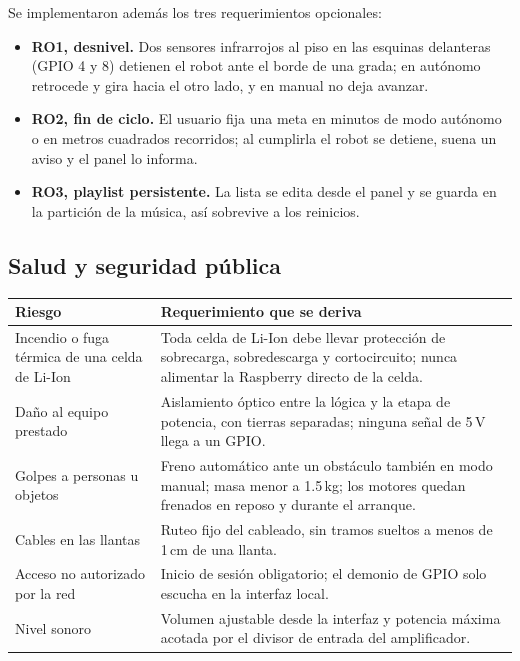\documentclass[11pt,a4paper]{article}
\begin{document}
Se implementaron además los tres requerimientos opcionales:

\begin{itemize}
  \item \textbf{RO1, desnivel.} Dos sensores infrarrojos al piso en las
        esquinas delanteras (GPIO 4 y 8) detienen el robot ante el borde de
        una grada; en autónomo retrocede y gira hacia el otro lado, y en
        manual no deja avanzar.
  \item \textbf{RO2, fin de ciclo.} El usuario fija una meta en minutos de
        modo autónomo o en metros cuadrados recorridos; al cumplirla el robot
        se detiene, suena un aviso y el panel lo informa.
  \item \textbf{RO3, playlist persistente.} La lista se edita desde el panel
        y se guarda en la partición de la música, así sobrevive a los
        reinicios.
\end{itemize}

\subsection{Salud y seguridad pública}

\begin{center}
\begin{tabularx}{\linewidth}{L{3.6cm}Y}
\toprule
\textbf{Riesgo} & \textbf{Requerimiento que se deriva} \\
\midrule
Incendio o fuga térmica de una celda de Li-Ion & Toda celda de Li-Ion debe
llevar protección de sobrecarga, sobredescarga y cortocircuito; nunca
alimentar la Raspberry directo de la celda. \\
Daño al equipo prestado & Aislamiento óptico entre la lógica y la etapa de
potencia, con tierras separadas; ninguna señal de 5\,V llega a un GPIO. \\
Golpes a personas u objetos & Freno automático ante un obstáculo también en
modo manual; masa menor a 1.5\,kg; los motores quedan frenados en reposo y
durante el arranque. \\
Cables en las llantas & Ruteo fijo del cableado, sin tramos sueltos a menos
de 1\,cm de una llanta. \\
Acceso no autorizado por la red & Inicio de sesión obligatorio; el demonio
de GPIO solo escucha en la interfaz local. \\
Nivel sonoro & Volumen ajustable desde la interfaz y potencia máxima acotada
por el divisor de entrada del amplificador. \\
\bottomrule
\end{tabularx}
\end{center}
\end{document}
